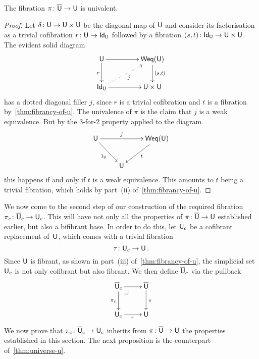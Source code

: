 \documentclass[reqno,10pt,a4paper,oneside,draft]{amsart}
\begin{document}
\begin{corollary} \label{thm:univalence-of-u}
The fibration $\pi \colon \overline{\mathsf{U}} \to \mathsf{U}$ is univalent.
\end{corollary}

\begin{proof} Let $\delta \colon \mathsf{U} \to \mathsf{U} \times \mathsf{U}$ be the diagonal map of $\mathsf{U}$ and consider its factorisation
as a trivial cofibration $r \colon \mathsf{U} \to \mathsf{Id}_{\mathsf{U}}$ followed by a fibration $(s,t) \colon \mathsf{Id}_{\mathsf{U}} \to \mathsf{U} \times \mathsf{U}$. The evident solid diagram
\[
\xymatrix@C=1.5cm{
\U \ar[r] \ar[d]_r & \Weq(\U) \ar[d]^{(s,t)} \\
\mathsf{Id}_\U \ar[r]  \ar@{.>}[ur]_{j} &  \U \times \U }
\]
has a dotted diagonal filler $j$, since $r$ is a trivial cofibration and $t$ is a fibration by~\cref{thm:fibrancy-of-u}. The univalence of $\pi$ is the claim that $j$ is a weak equivalence. But by the 3-for-2 property applied to the diagram
\[
\xymatrix{
\U  \ar[rr]^-{j} \ar[dr]_{1_\U} & &   \Weq(\U)  \ar[dl]^t \\
 & \U & }
\]
this happens if and only if $t$ is a weak equivalence. This amounts to $t$ being a trivial
fibration, which holds by part~(ii) of~\cref{thm:fibrancy-of-u}. 
\end{proof} 





\bigskip

We now come to the second step of our construction of the required fibration $\pi_c \colon \overline{\mathsf{U}}_c \to \mathsf{U}_c$.
This will have not only all the properties of $\pi \colon \overline{\mathsf{U}} \to \mathsf{U}$ established earlier, but also a bifibrant base.  In order to do this, let $\mathsf{U}_c$ be a cofibrant replacement of~$\mathsf{U}$,  which comes with a trivial fibration
\begin{equation}
\label{equ:ucu}
\tau \colon \mathsf{U}_c \rightarrow \mathsf{U} \, .
\end{equation}
Since $\mathsf{U}$ is fibrant, as shown in part~(iii) of~\cref{thm:fibrancy-of-u}, the simplicial set $\mathsf{U}_c$ is not only cofibrant but also fibrant. We then define $\overline{\mathsf{U}}_c$ via the pullback
\[
\xymatrix{
\UU_c \ar[d]_{\pi_c} \ar[r] \drpullback & \UU \ar[d]^{\pi}  \\
\U_c \ar[r]_\tau & \U}
\]
We now prove that $\pi_c \colon \overline{\mathsf{U}}_c \to \mathsf{U}_c$ inherits from $\pi \colon \overline{\mathsf{U}} \to \mathsf{U}$ the properties
established in this section. The next proposition is the counterpart of~\cref{thm:universe-u}. 
\end{document}
